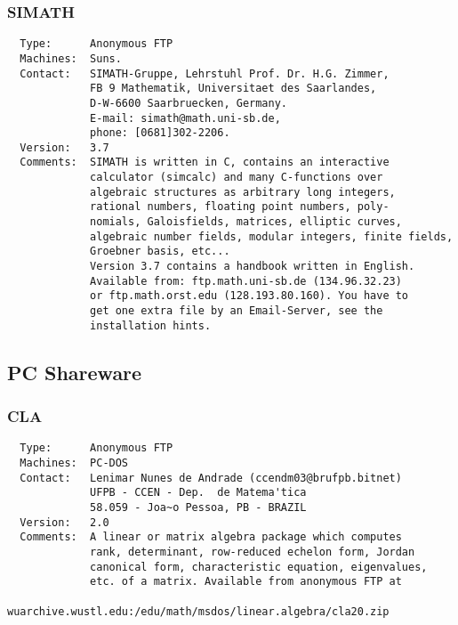 \documentclass[twoside,11pt]{article}
\begin{document}
\subsubsection{SIMATH}
\begin{verbatim}
  Type:      Anonymous FTP
  Machines:  Suns.
  Contact:   SIMATH-Gruppe, Lehrstuhl Prof. Dr. H.G. Zimmer,
             FB 9 Mathematik, Universitaet des Saarlandes,
             D-W-6600 Saarbruecken, Germany.
             E-mail: simath@math.uni-sb.de,
             phone: [0681]302-2206.
  Version:   3.7
  Comments:  SIMATH is written in C, contains an interactive
             calculator (simcalc) and many C-functions over
             algebraic structures as arbitrary long integers,
             rational numbers, floating point numbers, poly-
             nomials, Galoisfields, matrices, elliptic curves,
             algebraic number fields, modular integers, finite fields,
             Groebner basis, etc...
             Version 3.7 contains a handbook written in English.
             Available from: ftp.math.uni-sb.de (134.96.32.23)
             or ftp.math.orst.edu (128.193.80.160). You have to
             get one extra file by an Email-Server, see the
             installation hints.
\end{verbatim}


\subsection{PC Shareware}

\subsubsection{CLA}
\begin{verbatim}
  Type:      Anonymous FTP
  Machines:  PC-DOS
  Contact:   Lenimar Nunes de Andrade (ccendm03@brufpb.bitnet)
             UFPB - CCEN - Dep.  de Matema'tica
             58.059 - Joa~o Pessoa, PB - BRAZIL
  Version:   2.0
  Comments:  A linear or matrix algebra package which computes
             rank, determinant, row-reduced echelon form, Jordan
             canonical form, characteristic equation, eigenvalues,
             etc. of a matrix. Available from anonymous FTP at
             wuarchive.wustl.edu:/edu/math/msdos/linear.algebra/cla20.zip
\end{verbatim}
\end{document}
